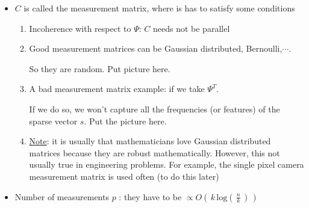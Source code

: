 \documentclass[12pt,a4paper]{book}
\begin{document}
\begin{itemize}

\item $C$ is called the measurement matrix, where is has to satisfy some conditions

	\begin{enumerate}
	\item Incoherence with respect to $\Psi$: $C$ needs not be parallel 
	
	\item Good measurement matrices can be Gaussian distributed, Bernoulli,$\cdots$.
	
	So they are random. Put picture here. 
	
	\item A bad measurement matrix example: if we take $\Psi^T$.
	
	If we do so, we won't capture all the frequencies (or features) of the sparse vector $s$. Put the picture here.
	
	\item \underline{Note}: it is usually that mathematicians love Gaussian distributed matrices because they are robust mathematically. However, this not usually true in engineering problems. For example, the single pixel camera measurement matrix is used often (to do this later)
	\end{enumerate}


\item Number of measurements $p$ : they have to be $	\propto O \left(\, k \, \text{log}\displaystyle \left(\,\frac{n}{k}  \,\right)\,\right)$
\end{itemize}






\end{document}
